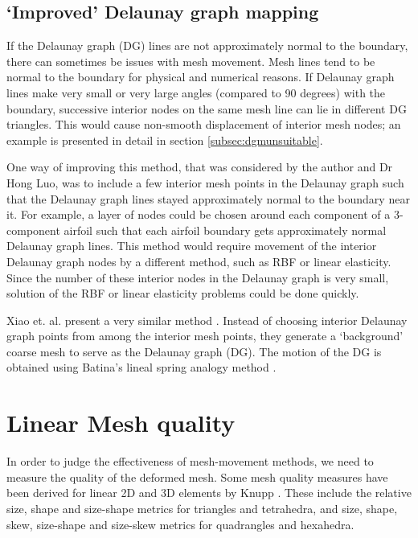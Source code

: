  \subsection{`Improved' Delaunay graph mapping}
 \label{sec:hybriddg}
 If the Delaunay graph (DG) lines are not approximately normal to the boundary, there can sometimes be issues with mesh movement. Mesh lines tend to be normal to the boundary for physical and numerical reasons. If Delaunay graph lines make very small or very large angles (compared to 90 degrees) with the boundary, successive interior nodes on the same mesh line can lie in different DG triangles. This would cause non-smooth displacement of interior mesh nodes; an example is presented in detail in section \ref{subsec:dgmunsuitable}.
 
 One way of improving this method, that was considered by the author and Dr Hong Luo, was to include a few interior mesh points in the Delaunay graph such that the Delaunay graph lines stayed approximately normal to the boundary near it. For example, a layer of nodes could be chosen around each component of a 3-component airfoil such that each airfoil boundary gets approximately normal Delaunay graph lines. This method would require movement of the interior Delaunay graph nodes by a different method, such as RBF or linear elasticity. Since the number of these interior nodes in the Delaunay graph is very small, solution of the RBF or linear elasticity problems could be done quickly.
 
 
 Xiao et. al. present a very similar method \cite{mm:hybriddg}. Instead of choosing interior Delaunay graph points from among the interior mesh points, they generate a `background' coarse mesh to serve as the Delaunay graph (DG). The motion of the DG is obtained using Batina's lineal spring analogy method \cite{mm:batina}.
 
 \section{Linear Mesh quality}
 \label{sec:lin-mesh-quality}
 In order to judge the effectiveness of mesh-movement methods, we need to measure the quality of the deformed mesh. Some mesh quality measures have been derived for linear 2D and 3D elements by Knupp \cite{qualknupp}. These include the relative size, shape and size-shape metrics for triangles and tetrahedra, and size, shape, skew, size-shape and size-skew metrics for quadrangles and hexahedra.
 
